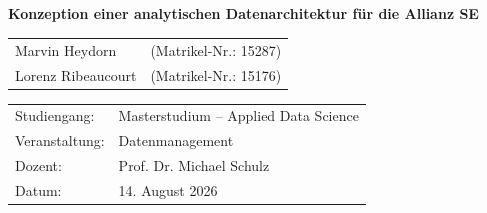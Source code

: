 \documentclass[
  12pt,
  a4paper,
  oneside,
  headings=big,
  parskip=half,
  bibliography=totoc,
  listof=totoc
]{scrreprt}
\title{\thesistitle\\\large\thesissubtitle}
\author{\authorA}
\date{\thesisdate}
\newcommand{\thesistitle}{Konzeption einer analytischen Datenarchitektur für die Allianz SE}
\newcommand{\thesissubtitle}{}
\newcommand{\authorA}{Marvin Heydorn}
\newcommand{\matrikelA}{15287}
\newcommand{\authorB}{Lorenz Ribeaucourt}
\newcommand{\matrikelB}{15176}
\newcommand{\thesisprogram}{Masterstudium -- Applied Data Science}
\newcommand{\thesiscourse}{Datenmanagement}
\newcommand{\thesissupervisor}{Prof. Dr. Michael Schulz}
\newcommand{\thesisdate}{14. August 2026}
\begin{document}
\raggedbottom
{}

\begin{titlepage}
  \centering
  \vspace*{2cm}

  {\LARGE\bfseries \thesistitle\par}
  \vspace{0.5cm}
  {\Large \thesissubtitle\par}

  \vspace{1.5cm}
  \begin{tabular}{@{}ll@{}}
    \authorA & (Matrikel-Nr.: \matrikelA) \\
    \authorB & (Matrikel-Nr.: \matrikelB)
  \end{tabular}
  \vfill

  \begin{tabular}{@{}ll@{}}
    Studiengang: & \thesisprogram\\
    Veranstaltung: & \thesiscourse\\
    Dozent: & \thesissupervisor\\
    Datum: & \thesisdate
  \end{tabular}

  \vspace*{2cm}
\end{titlepage}



\clearpage
\tableofcontents
\listoffigures


\clearpage

\setcounter{page}{1}







\clearpage
{}



\clearpage
{}
{}

\end{document}
